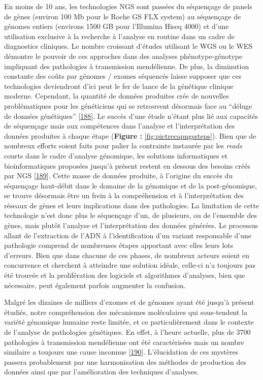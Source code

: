 \documentclass[12pt,a4paper,twoside]{ugathesis}
\theoremstyle{definition}
\theoremstyle{definition}
\theoremstyle{definition}
\theoremstyle{remark}
\begin{document}
En moins de 10 ans, les technologies NGS sont passées du séquençage de
panels de gènes (environ 100 Mb pour le Roche GS FLX system) au
séquençage de génomes entiers (environs 1500 GB pour l'Illumina Hiseq
4000) et d'une utilisation exclusive à la recherche à l'analyse en
routine dans un cadre de diagnostics cliniques. Le nombre croissant
d'études utilisant le WGS ou le WES démontre le pouvoir de ces approches
dans des analyses phénotype-génotype impliquant des pathologies à
transmission mendélienne. De plus, la diminution constante des coûts par
génomes / exomes séquencés laisse supposer que ces technologies
deviendront d'ici peut le fer de lance de la génétique clinique moderne.
Cependant, la quantité de données produites crée de nouvelles
problématiques pour les généticiens qui se retrouvent désormais face au
``déluge de données génétiques''
{[}\protect\hyperlink{ref-Schatz2013}{188}{]}. Le succès d'une étude
n'étant plus lié aux capacités de séquençage mais aux compétences dans
l'analyse et l'interprétation des données produites à chaque étape
(\textbf{Figure :} \ref{fig:pictrecapngssteps}). Bien que de nombreux
efforts soient faits pour palier la contrainte instaurée par les
\emph{reads} courts dans le cadre d'analyse génomique, les solutions
informatiques et bioinformatiques proposées jusqu'à présent restent en
dessous des besoins créés par NGS
{[}\protect\hyperlink{ref-McPherson2009}{189}{]}. Cette masse de données
produite, à l'origine du succès du séquençage haut-débit dans le domaine
de la génomique et de la post-génomique, se trouve désormais être un
frein à la compréhension et à l'interprétation des réseaux de gènes et
leurs implications dans des pathologies. La limitation de cette
technologie n'est donc plus le séquençage d'un, de plusieurs, ou de
l'ensemble des gènes, mais plutôt l'analyse et l'interprétation des
données générées. Le processus allant de l'extraction de l'ADN à
l'identification d'un variant responsable d'une pathologie comprend de
nombreuses étapes apportant avec elles leurs lots d'erreurs. Bien que
dans chacune de ces phases, de nombreux acteurs soient en concurrence et
cherchent à atteindre une solution idéale, celle-ci n'a toujours pas été
trouvée et la prolifération des logiciels et algorithmes d'analyses,
bien que nécessaire, peut également parfois augmenter la confusion.

Malgré les dizaines de milliers d'exomes et de génomes ayant été jusqu'à
présent étudiés, notre compréhension des mécanismes moléculaires qui
sous-tendent la variété génomique humaine reste limitée, et ce
particulièrement dans le contexte de l'analyse de pathologies
génétiques. En effet, à l'heure actuelle, plus de 3700 pathologies à
transmission mendélienne ont été caractérisées mais un nombre similaire
a toujours une cause inconnue
{[}\protect\hyperlink{ref-Amberger2011}{190}{]}. L'élucidation de ces
mystères passera probablement par une harmonisation des méthodes de
production des données ainsi que par l'amélioration des techniques
d'analyses.
\end{document}
